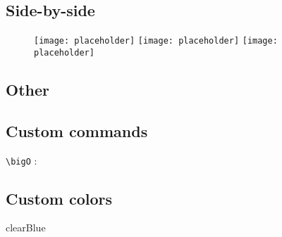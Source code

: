 \documentclass{customSynthesis}
\begin{document}
\subsection*{Side-by-side}

\begin{figure}[H]
    \centering
    \texttt{[image: placeholder]}\hfill
	\texttt{[image: placeholder]}\hfill
	\texttt{[image: placeholder]}
\end{figure}

\subsection*{Other}

\subsection*{Custom commands}

\verb|\bigO| : \bigO

\subsection*{Custom colors}

\textcolor{clearBlue}{clearBlue}
\end{document}
